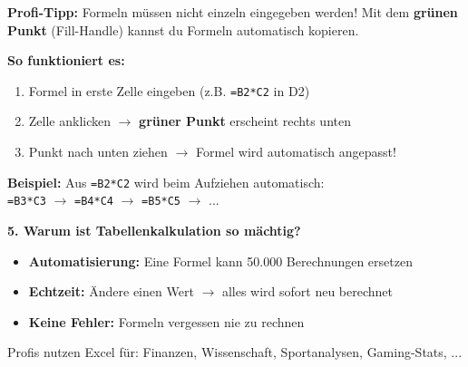 \documentclass[11pt, a4paper]{article}
\begin{document}
\begin{merkkasten}
\textbf{Profi-Tipp:} Formeln müssen nicht einzeln eingegeben werden! Mit dem \textbf{grünen Punkt} (Fill-Handle) kannst du Formeln automatisch kopieren.
\end{merkkasten}

\textbf{So funktioniert es:}
\begin{enumerate}[leftmargin=1.5em, itemsep=2pt]
    \item Formel in erste Zelle eingeben (z.B. \texttt{=B2*C2} in D2)
    \item Zelle anklicken $\rightarrow$ \textcolor{excelgruen}{\textbf{grüner Punkt}} erscheint rechts unten
    \item Punkt nach unten ziehen $\rightarrow$ Formel wird automatisch angepasst!
\end{enumerate}

\begin{excelbox}
\textbf{Beispiel:} Aus \texttt{=B2*C2} wird beim Aufziehen automatisch:\\[0.3em]
\hspace*{1em}\texttt{=B3*C3} $\rightarrow$ \texttt{=B4*C4} $\rightarrow$ \texttt{=B5*C5} $\rightarrow$ ...
\end{excelbox}

\vspace{0.3em}


\textbf{\textcolor{fachfarbe}{5. Warum ist Tabellenkalkulation so mächtig?}}

\begin{itemize}[leftmargin=1.5em, itemsep=2pt]
    \item \textbf{Automatisierung:} Eine Formel kann 50.000 Berechnungen ersetzen
    \item \textbf{Echtzeit:} Ändere einen Wert $\rightarrow$ alles wird sofort neu berechnet
    \item \textbf{Keine Fehler:} Formeln vergessen nie zu rechnen
\end{itemize}

{\small\textcolor{mittelgrau}{Profis nutzen Excel für: Finanzen, Wissenschaft, Sportanalysen, Gaming-Stats, ...}}

\end{document}
